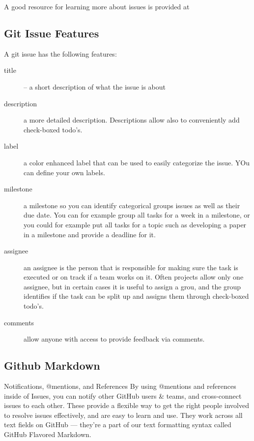 
A good resource for learning more about issues is provided at 


\subsection{Git Issue Features}

A git issue has the following features:

\begin{description}
\item [title] -- a short description of what the issue is about
\item [description] a more detailed description. Descriptions allow
  also to conveniently add check-boxed todo's.
\item [label] a color enhanced label that can be used to easily
  categorize the issue. YOu can define your own labels.
\item [milestone] a milestone so you can identify categorical groups
  issues as well as their due date. You can for example group all
  tasks for a week in a milestone, or you could for example put all
  tasks for a topic such as developing a paper in a milestone and
  provide a deadline for it.
\item[assignee] an assignee is the person that is responsible for
  making sure the task is executed or on track if a team works on
  it. Often projects allow only one assignee, but in certain cases it
  is useful to assign a grou, and the group identifies if the task can
  be split up and assigns them through check-boxed todo's.
\item [comments] allow anyone with access to provide feedback via
  comments.
\end{description}

\subsection{Github Markdown}

Notifications, @mentions, and References
By using @mentions and references inside of Issues, you can notify
other GitHub users & teams, and cross-connect issues to each
other. These provide a flexible way to get the right people involved
to resolve issues effectively, and are easy to learn and use. They
work across all text fields on GitHub — they’re a part of our text
formatting syntax called GitHub Flavored Markdown.

